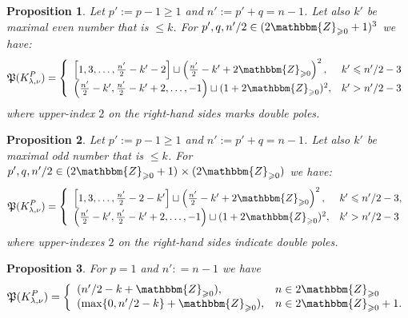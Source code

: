 \documentclass{article}
\newcommand{\assign}{:=}
\numberwithin{definition}{section}
\numberwithin{lemma}{section}
\newtheorem{proposition}{Proposition}
\numberwithin{proposition}{section}
{\theorembodyfont{\rmfamily}\newtheorem{remark}{Remark}
\numberwithin{remark}{section}
}
\begin{document}
\begin{proposition}
  \label{KP-normalization-2:prop-4}Let $p' \assign p - 1 \geqslant 1$ and $n'
  \assign p' + q = n - 1$. Let also $k'$ be maximal even number that is
  $\leqslant k$. For $p', q, n' / 2 \in ( 2\mathbbm{Z}_{\geqslant 0} + 1)^3$
  we have:
  \[ \mathfrak{P} ( K_{\lambda, \nu}^P) = \left\{ \begin{array}{ll}
       \left[ 1, 3, \ldots, \frac{n'}{2} - k' - 2 \right] \sqcup \left(
       \frac{n'}{2} - k' + 2\mathbbm{Z}_{\geqslant 0} \right)^2, & k'
       \leqslant n' / 2 - 3\\
       \left( \frac{n'}{2} - k', \frac{n'}{2} - k' + 2, \ldots, - 1 \right)
       \sqcup ( 1 + 2\mathbbm{Z}_{\geqslant 0})^2, & k' > n' / 2 - 3
     \end{array} \right. \]
  where upper-index $2$ on the right-hand sides marks double poles.
\end{proposition}

\begin{proposition}
  \label{KP-normalization-2:prop-5}Let $p' \assign p - 1 \geqslant 1$ and $n'
  \assign p' + q = n - 1$. Let also $k'$ be maximal odd number that is
  $\leqslant k$. For $p', q, n' / 2 \in ( 2\mathbbm{Z}_{\geqslant 0} + 1)^{}
  \times ( 2\mathbbm{Z}_{\geqslant 0})$ we have:
  \[ \mathfrak{P} ( K_{\lambda, \nu}^P) = \left\{ \begin{array}{ll}
       \left[ 1, 3, \ldots, \frac{n'}{2} - 2 - k' \right] \sqcup \left(
       \frac{n'}{2} - k' + 2\mathbbm{Z}_{\geqslant 0} \right)^2, & k'
       \leqslant n' / 2 - 3,\\
       \left( \frac{n'}{2} - k', \frac{n'}{2} - k' + 2, \ldots, - 1 \right)
       \sqcup ( 1 + 2\mathbbm{Z}_{\geqslant 0})^2, & k' > n' / 2 - 3
     \end{array} \right. \]
  where upper-indexes $2$ on the right-hand sides indicate double poles.
\end{proposition}

\begin{proposition}
  \label{KP-normalization-2:prop-p=1}For $p = 1$ and $n' : = n - 1$ we have
  \[ \mathfrak{P} ( K_{\lambda, \nu}^P) = \left\{ \begin{array}{ll}
       ( n' / 2 - k +\mathbbm{Z}_{\geqslant 0}), & n \in
       2\mathbbm{Z}_{\geqslant 0}\\
       ( \max \{ 0, n' / 2 - k \} +\mathbbm{Z}_{\geqslant 0}), & n \in
       2\mathbbm{Z}_{\geqslant 0} + 1.
     \end{array} \right. \]
\end{proposition}
\end{document}
